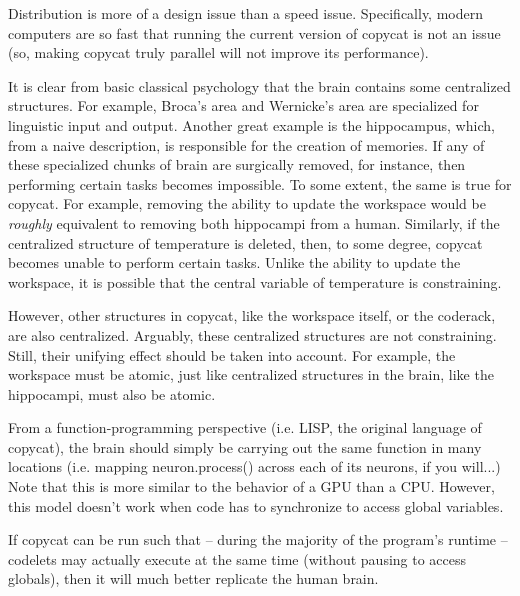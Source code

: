 \documentclass[a4paper]{article}
\begin{document}
    Distribution is more of a design issue than a speed issue.
    Specifically, modern computers are so fast that running the current version of copycat is not an issue (so, making copycat truly parallel will not improve its performance).

    It is clear from basic classical psychology that the brain contains some centralized structures.
    For example, Broca's area and Wernicke's area are specialized for linguistic input and output.
    Another great example is the hippocampus, which, from a naive description, is responsible for the creation of memories.
    If any of these specialized chunks of brain are surgically removed, for instance, then performing certain tasks becomes impossible.
    To some extent, the same is true for copycat.
    For example, removing the ability to update the workspace would be \emph{roughly} equivalent to removing both hippocampi from a human.
    Similarly, if the centralized structure of temperature is deleted, then, to some degree, copycat becomes unable to perform certain tasks.
    Unlike the ability to update the workspace, it is possible that the central variable of temperature is constraining.

    However, other structures in copycat, like the workspace itself, or the coderack, are also centralized.
    Arguably, these centralized structures are not constraining.
    Still, their unifying effect should be taken into account.
    For example, the workspace must be atomic, just like centralized structures in the brain, like the hippocampi, must also be atomic.

    From a function-programming perspective (i.e. LISP, the original language of copycat), the brain should simply be carrying out the same function in many locations (i.e. mapping neuron.process() across each of its neurons, if you will...)
    Note that this is more similar to the behavior of a GPU than a CPU.
    However, this model doesn't work when code has to synchronize to access global variables.

    If copycat can be run such that -- during the majority of the program's runtime -- codelets may actually execute at the same time (without pausing to access globals), then it will much better replicate the human brain.

\end{document}
